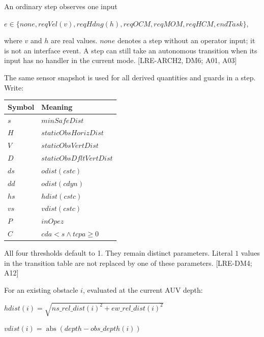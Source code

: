 \documentclass[10pt,a4paper]{article}
\begin{document}
An ordinary step observes one input

$\mathit{e} \in  \{\mathit{none}, \mathit{reqVel}(\mathit{v}), \mathit{reqHdng}(\mathit{h}), \mathit{reqOCM}, \mathit{reqMOM}, \mathit{reqHCM}, \mathit{endTask}\}$,

where $\mathit{v}$ and $\mathit{h}$ are real values. $\mathit{none}$ denotes a step without an operator input; it is not an interface event. A step can still take an autonomous transition when its input has no handler in the current mode. [LRE-ARCH2, DM6; A01, A03]

The same sensor snapshot is used for all derived quantities and guards in a step. Write:

\begin{longtable}{@{}L{0.18\textwidth}L{0.74\textwidth}@{}}
\toprule
\textbf{Symbol} & \textbf{Meaning} \\
\midrule
\endhead

$\mathit{s}$ & $\mathit{minSafeDist}$ \\
$\mathit{H}$ & $\mathit{staticObsHorizDist}$ \\
$\mathit{V}$ & $\mathit{staticObsVertDist}$ \\
$\mathit{D}$ & $\mathit{staticObsDfltVertDist}$ \\
$\mathit{ds}$ & $\mathit{odist}(\mathit{cstc})$ \\
$\mathit{dd}$ & $\mathit{odist}(\mathit{cdyn})$ \\
$\mathit{hs}$ & $\mathit{hdist}(\mathit{cstc})$ \\
$\mathit{vs}$ & $\mathit{vdist}(\mathit{cstc})$ \\
$\mathit{P}$ & $\mathit{inOpez}$ \\
$\mathit{C}$ & $\mathit{cda} < \mathit{s} \land  \mathit{tcpa} \ge  0$ \\
\bottomrule
\end{longtable}

All four thresholds default to 1. They remain distinct parameters. Literal $1$ values in the transition table are not replaced by one of these parameters. [LRE-DM4; A12]

For an existing obstacle $\mathit{i}$, evaluated at the current AUV depth:

$\mathit{hdist}(\mathit{i}) = \sqrt{\mathit{ns\_rel\_dist}(\mathit{i})^{2} + \mathit{ew\_rel\_dist}(\mathit{i})^{2}}$

$\mathit{vdist}(\mathit{i}) = \operatorname{abs}(\mathit{depth} - \mathit{obs\_depth}(\mathit{i}))$
\end{document}
